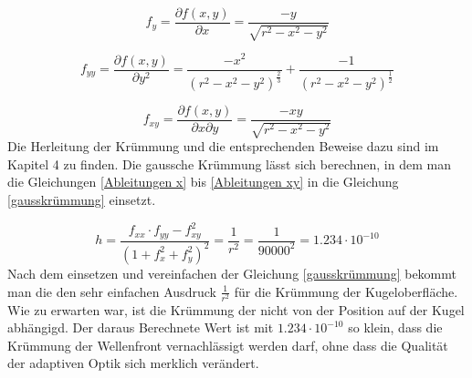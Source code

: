 \begin{refsection}
\begin{equation}\label{Ableitungen y}
f_{y} =\dfrac{\partial f(x,y)}{\partial x}= \dfrac{-y}{\sqrt{r^{2}-x^{2}-y^{2}}}
\end{equation}

\begin{equation}\label{Ableitungen yy}
f_{yy}=\dfrac{\partial f(x,y)}{\partial y^{2}}= \dfrac{- x^2}{(r^2 - x^2 - y^2)^{\frac{2}{3}}}+\dfrac{ - 1}{(r^2 - x^2 - y^2)^{\frac{1}{2}}}
\end{equation}

\begin{equation}\label{Ableitungen xy}
f_{xy}=\dfrac{\partial f(x,y)}{\partial x \partial y}=  \dfrac{-xy}{\sqrt{r^{2}-x^{2}-y^{2}}}
\end{equation}
Die Herleitung der Krümmung und die entsprechenden Beweise dazu sind im Kapitel 4 zu finden. Die gaussche Krümmung lässt sich berechnen, in dem man die Gleichungen \eqref{Ableitungen x} bis \eqref{Ableitungen xy} in die Gleichung \eqref{gausskrümmung} einsetzt.  

\begin{equation}\label{gausskrümmung}
h = \dfrac{f_{xx} \cdot f_{yy} -f_{xy}^{2}}{(1+f_{x}^{2}+f_{y}^{2})^{2}} = \dfrac{1}{r^{2}} =\dfrac{1}{90000^{2}} = 1.234\cdot 10^{-10}
\end{equation}
Nach dem einsetzen und vereinfachen der Gleichung \eqref{gausskrümmung} bekommt man die den sehr einfachen Ausdruck $\frac{1}{r^{2}}$ für die Krümmung der Kugeloberfläche. Wie zu erwarten war, ist die Krümmung der nicht von der Position auf der Kugel abhängigd. 
Der daraus Berechnete Wert ist mit $1.234\cdot 10^{-10}$ so klein, dass die Krümmung der Wellenfront vernachlässigt werden darf, ohne dass die Qualität der adaptiven Optik sich merklich verändert.


\end{refsection}
